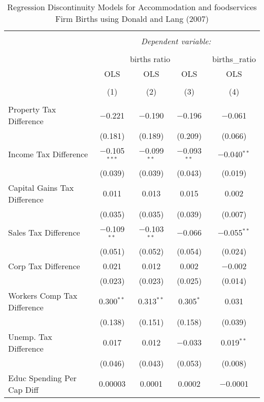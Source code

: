 
\begin{table}[!htbp] \centering 
  \caption{Regression Discontinuity Models for  Accommodation and foodservices Firm Births using Donald and Lang (2007)} 
  \label{} 
\begin{tabular}{@{\extracolsep{5pt}}lcccc} 
\\[-1.8ex]\hline 
\hline \\[-1.8ex] 
 & \multicolumn{4}{c}{\textit{Dependent variable:}} \\ 
\cline{2-5} 
\\[-1.8ex] & \multicolumn{3}{c}{births ratio} & births\_ratio \\ 
 & OLS & OLS & OLS & OLS \\ 
\\[-1.8ex] & (1) & (2) & (3) & (4)\\ 
\hline \\[-1.8ex] 
 Property Tax Difference & $-$0.221 & $-$0.190 & $-$0.196 & $-$0.061 \\ 
  & (0.181) & (0.189) & (0.209) & (0.066) \\ 
  Income Tax Difference & $-$0.105$^{***}$ & $-$0.099$^{**}$ & $-$0.093$^{**}$ & $-$0.040$^{**}$ \\ 
  & (0.039) & (0.039) & (0.043) & (0.019) \\ 
  Capital Gains Tax Difference & 0.011 & 0.013 & 0.015 & 0.002 \\ 
  & (0.035) & (0.035) & (0.039) & (0.007) \\ 
  Sales Tax Difference & $-$0.109$^{**}$ & $-$0.103$^{**}$ & $-$0.066 & $-$0.055$^{**}$ \\ 
  & (0.051) & (0.052) & (0.054) & (0.024) \\ 
  Corp Tax Difference & 0.021 & 0.012 & 0.002 & $-$0.002 \\ 
  & (0.023) & (0.023) & (0.025) & (0.014) \\ 
  Workers Comp Tax Difference & 0.300$^{**}$ & 0.313$^{**}$ & 0.305$^{*}$ & 0.031 \\ 
  & (0.138) & (0.151) & (0.158) & (0.039) \\ 
  Unemp. Tax Difference & 0.017 & 0.012 & $-$0.033 & 0.019$^{**}$ \\ 
  & (0.046) & (0.043) & (0.053) & (0.008) \\ 
  Educ Spending Per Cap Diff & 0.00003 & 0.0001 & 0.0002 & $-$0.0001 \\ 

\end{tabular}
\end{table}
